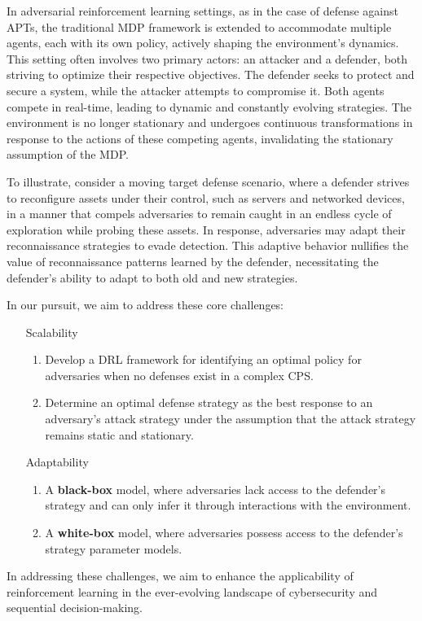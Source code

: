 In adversarial reinforcement learning settings, as in the case of defense against APTs, the traditional MDP framework is extended to accommodate multiple agents, each with its own policy, actively shaping the environment's dynamics. This setting often involves two primary actors: an attacker and a defender, both striving to optimize their respective objectives. The defender seeks to protect and secure a system, while the attacker attempts to compromise it. Both agents compete in real-time, leading to dynamic and constantly evolving strategies. The environment is no longer stationary and undergoes continuous transformations in response to the actions of these competing agents, invalidating the stationary assumption of the MDP.

To illustrate, consider a moving target defense scenario, where a defender strives to reconfigure assets under their control, such as servers and networked devices, in a manner that compels adversaries to remain caught in an endless cycle of exploration while probing these assets. In response, adversaries may adapt their reconnaissance strategies to evade detection. This adaptive behavior nullifies the value of reconnaissance patterns learned by the defender, necessitating the defender's ability to adapt to both old and new strategies.

In our pursuit, we aim to address these core challenges:

\begin{itemize}
    \item[Scalability] 
        \begin{enumerate}
            \item Develop a DRL framework for identifying an optimal policy for adversaries when no defenses exist in a complex CPS.
            
            \item Determine an optimal defense strategy as the best response to an adversary's attack strategy under the assumption that the attack strategy remains static and stationary.
        \end{enumerate}
    \item[Adaptability]
        \begin{enumerate}
            \item A \textbf{black-box} model, where adversaries lack access to the defender's strategy and can only infer it through interactions with the environment.
            
            \item A \textbf{white-box} model, where adversaries possess access to the defender's strategy parameter models.
        \end{enumerate}
\end{itemize}

In addressing these challenges, we aim to enhance the applicability of reinforcement learning in the ever-evolving landscape of cybersecurity and sequential decision-making.